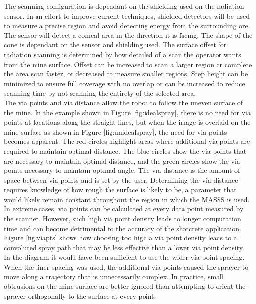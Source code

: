 The scanning configuration is dependant on the shielding used on the radiation sensor. In an effort to improve current techniques, shielded detectors will be used to measure a precise region and avoid detecting energy from the surrounding ore. The sensor will detect a conical area in the direction it is facing. The shape of the cone is dependant on the sensor and shielding used. The surface offset for radiation scanning is determined by how detailed of a scan the operator wants from the mine surface. Offset can be increased to scan a larger region or complete the area scan faster, or decreased to measure smaller regions. Step height can be minimized to ensure full coverage with no overlap or can be increased to reduce scanning time by not scanning the entirety of the selected area.\\

The via points and via distance allow the robot to follow the uneven surface of the mine. In the example shown in Figure \ref{fig:idealspray}, there is no need for via points at locations along the straight lines, but when the image is overlaid on the mine surface as shown in Figure \ref{fig:unidealspray}, the need for via points becomes apparent. The red circles highlight areas where additional via points are required to maintain optimal distance. The blue circles show the via points that are necessary to maintain optimal distance, and the green circles show the via points necessary to maintain optimal angle. The via distance is the amount of space between via points and is set by the user. Determining the via distance requires knowledge of how rough the surface is likely to be, a parameter that would likely remain constant throughout the region in which the MASSS is used. In extreme cases, via points can be calculated at every data point measured by the scanner. However, such high via point density leads to longer computation time and can become detrimental to the accuracy of the shotcrete application. Figure \ref{fig:viapts} shows how choosing too high a via point density leads to a convoluted spray path that may be less effective than a lower via point density. In the diagram it would have been sufficient to use the wider via point spacing. When the finer spacing was used, the additional via points caused the sprayer to move along a trajectory that is unnecessarily complex.  In practice, small obtrusions on the mine surface are better ignored than attempting to orient the sprayer orthogonally to the surface at every point.\\

